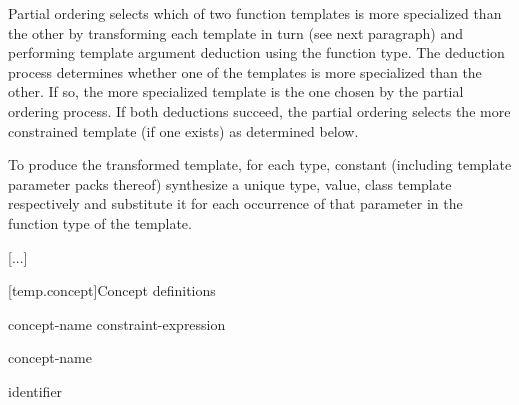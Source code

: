 \documentclass{wg21}
\begin{document}
\pnum
Partial ordering selects which of two function templates is more
specialized than the other by transforming each template in turn
(see next paragraph) and performing template argument deduction
using the function type.
The deduction process determines whether
one of the templates is more specialized than the other. If so, the
more specialized template is the one chosen by the partial ordering
process.
If both deductions succeed, the partial ordering selects
the more constrained template (if one exists) as determined below.
%

To produce the transformed template, for each type, constant (including template parameter packs 
thereof) synthesize a unique type, value,  class template 
respectively and substitute it for each occurrence of that parameter
in the function type of the template.


\textcolor{noteclr}{[...]}

[temp.concept]{Concept definitions}

\begin{bnf}
    \br
     concept-name  \terminal{=} constraint-expression \terminal{;}
\end{bnf}

\begin{addedblock}
    \begin{bnf}
        \br
         concept-name
    \end{bnf}
\end{addedblock}

\begin{bnf}
    \br
    identifier
\end{bnf}


\begin{bnf}
    \br
    \br
\end{bnf}
\end{document}
